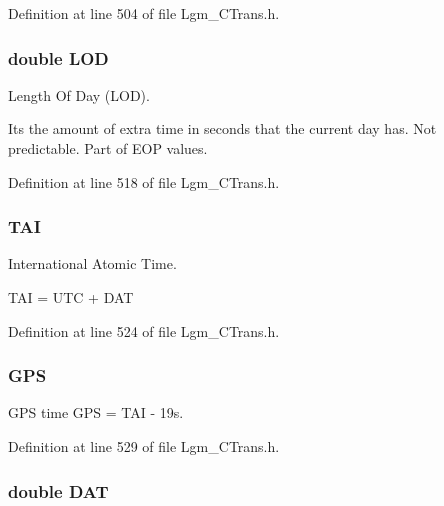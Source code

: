 Definition at line 504 of file Lgm\_\-CTrans.h.\hypertarget{struct_lgm___c_trans_190ed8b9906021fb489dc2ee35881d8b}{
\subsubsection[{LOD}]{\setlength{\rightskip}{0pt plus 5cm}double {\bf LOD}}}
\label{struct_lgm___c_trans_190ed8b9906021fb489dc2ee35881d8b}


Length Of Day (LOD). 

Its the amount of extra time in seconds that the current day has. Not predictable. Part of EOP values. 

Definition at line 518 of file Lgm\_\-CTrans.h.\hypertarget{struct_lgm___c_trans_c12a11b923b2dd78320f3b222f5b4b7c}{
\subsubsection[{TAI}]{ {\bf TAI}}}
\label{struct_lgm___c_trans_c12a11b923b2dd78320f3b222f5b4b7c}


International Atomic Time. 

TAI = UTC + DAT 

Definition at line 524 of file Lgm\_\-CTrans.h.\hypertarget{struct_lgm___c_trans_ab5a2a9aa455c2df8b4d45a5b06d85c1}{
\subsubsection[{GPS}]{ {\bf GPS}}}
\label{struct_lgm___c_trans_ab5a2a9aa455c2df8b4d45a5b06d85c1}


GPS time GPS = TAI - 19s. 



Definition at line 529 of file Lgm\_\-CTrans.h.\hypertarget{struct_lgm___c_trans_e588c8af37ba03583b88718e40df15f2}{
\subsubsection[{DAT}]{\setlength{\rightskip}{0pt plus 5cm}double {\bf DAT}}}
\label{struct_lgm___c_trans_e588c8af37ba03583b88718e40df15f2}


